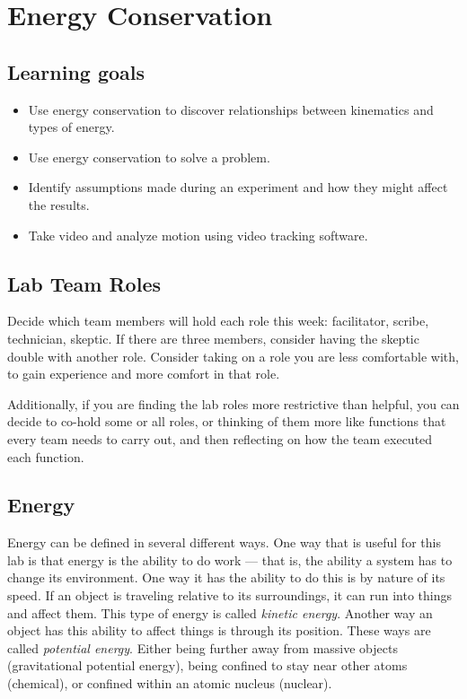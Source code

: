 \chapter{Energy Conservation}

\section{Learning goals}

\begin{itemize}
	\item Use energy conservation to discover relationships between kinematics and types of energy.
	
	\item Use energy conservation to solve a problem.
	
	\item Identify assumptions made during an experiment and how they might affect the results.
	
	\item Take video and analyze motion using video tracking software.
\end{itemize}

\section{Lab Team Roles}

Decide which team members will hold each role this week: facilitator, scribe, technician, skeptic. If there are three members, consider having the skeptic double with another role. Consider taking on a role you are less comfortable with, to gain experience and more comfort in that role.

Additionally, if you are finding the lab roles more restrictive than helpful, you can decide to co-hold some or all roles, or thinking of them more like functions that every team needs to carry out, and then reflecting on how the team executed each function.

\section{Energy}

Energy can be defined in several different ways. One way that is useful for this lab is that energy is the ability to do work --- that is, the ability a system has to change its environment. One way it has the ability to do this is by nature of its speed. If an object is traveling relative to its surroundings, it can run into things and affect them. This type of energy is called \textit{kinetic energy}. Another way an object has this ability to affect things is through its position. These ways are called \textit{potential energy}. Either being further away from massive objects (gravitational potential energy), being confined to stay near other atoms (chemical), or confined within an atomic nucleus (nuclear).

